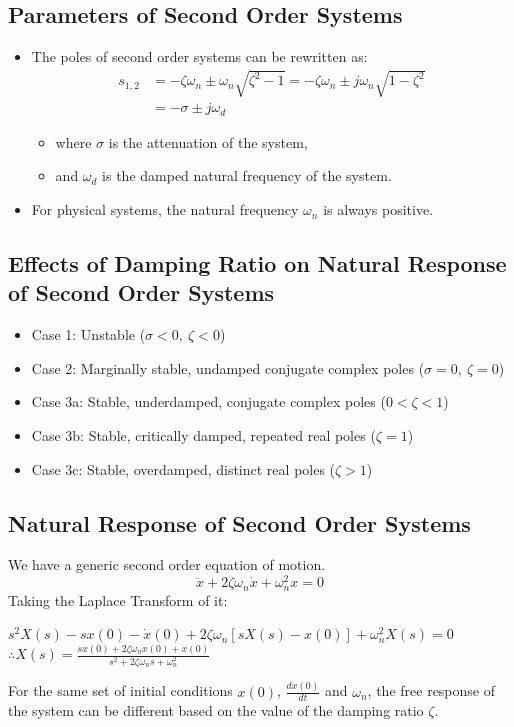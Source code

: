\documentclass[a4paper]{article}
\begin{document}
\subsection{Parameters of Second Order Systems}
\begin{itemize}
    \item The poles of second order systems can be rewritten as:
    \begin{align*}
        s_{1,2} &= -\zeta\omega_n\pm\omega_n\sqrt{\zeta^2-1}= -\zeta\omega_n\pm j\omega_n\sqrt{1-\zeta^2}\\
        &= -\sigma\pm j\omega_d
    \end{align*}
    \begin{itemize}[label=$\circ$]
        \item where $\sigma$ is the attenuation of the system, \quad {}
        \item and $\omega_d$ is the damped natural frequency of the system. \quad {}
    \end{itemize}
    \item For physical systems, the natural frequency $\omega_n$ is always positive. 
\end{itemize}

\subsection{Effects of Damping Ratio on Natural Response of Second Order Systems}
\begin{itemize}
    \item Case 1: Unstable ($\sigma < 0,\ \zeta < 0$)
    \item Case 2: Marginally stable, undamped conjugate complex poles ($\sigma = 0,\ \zeta = 0$)
    \item Case 3a: Stable, underdamped, conjugate complex poles ($0<\zeta<1$)
    \item Case 3b: Stable, critically damped, repeated real poles ($\zeta = 1$)
    \item Case 3c: Stable, overdamped, distinct real poles ($\zeta > 1$)
\end{itemize}

\subsection{Natural Response of Second Order Systems}
We have a generic second order equation of motion.
$$\ddot{x}+2\zeta\omega_n\dot{x}+\omega_n^2x = 0$$
Taking the Laplace Transform of it:
\begin{center}
    $s^2X(s)-sx(0) -\dot{x}(0)+2\zeta\omega_n[sX(s)-x(0)]+\omega_n^2X(s) = 0$\vspace{0.1cm}\\
    $\therefore X(s) = \displaystyle\frac{sx(0)+2\zeta\omega_n x(0)+\dot{x}(0)}{s^2+2\zeta\omega_n s+\omega_n^2}$
\end{center}
For the same set of initial conditions $x(0)$, $\displaystyle\frac{dx(0)}{dt}$ and $\omega_n$, the free response of the system can be different based on the value of the damping ratio $\zeta$.
\end{document}
